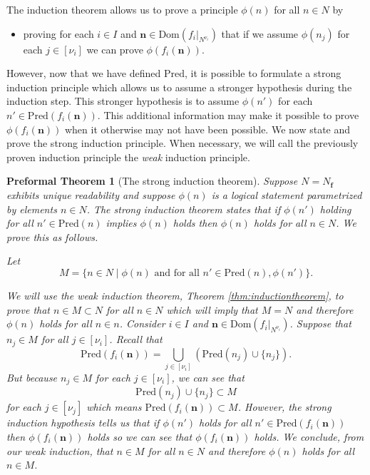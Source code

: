 \documentclass[oneside, 12pt]{book}
\theoremstyle{break}
\newtheorem{preformal definition}[definition]{Preformal Definition}
\newtheorem{preformal theorem}[theorem]{Preformal Theorem}
\newcommand{\bv}[1]{\boldsymbol{#1}}
\begin{document}
			The induction theorem allows us to prove a principle $\phi(n)$ for all $n\in N$ by 
			\begin{itemize}
				\item{proving for each $i\in I$ and $\bv{n}\in\text{Dom}(f_i|_{N^{\nu_i}})$ that if we assume $\phi(n_j)$ for each $j\in [\nu_i]$ we can prove $\phi(f_i(\bv{n}))$.}
			\end{itemize}
			However, now that we have defined $\text{Pred}$, it is possible to formulate a strong induction principle which allows us to assume a stronger hypothesis during the induction step.
			This stronger hypothesis is to assume $\phi(n')$ for each $n'\in \text{Pred}(f_i(\bv{n}))$.
			This additional information may make it possible to prove $\phi(f_i(\bv{n}))$ when it otherwise may not have been possible.
			We now state and prove the strong induction principle.
			When necessary, we will call the previously proven induction principle the \textit{weak} induction principle.
			
			\begin{preformal theorem}[The strong induction theorem]
				Suppose $N = N_{\bv{f}}$ exhibits unique readability and suppose $\phi(n)$ is a logical statement parametrized by elements $n\in N$.
				The strong induction theorem states that if $\phi(n')$ holding for all $n' \in \text{Pred}(n)$ implies $\phi(n)$ holds then $\phi(n)$ holds for all $n\in N$.
				We prove this as follows.
				
				Let 
				\begin{equation*}
					M = \{n \in N \mid \phi(n) \text{ and for all } n' \in \text{Pred}(n), \phi(n')\}.
				\end{equation*}

				We will use the weak induction theorem, Theorem \ref{thm:inductiontheorem}, to prove that $n\in M\subset N$ for all $n\in N$ which will imply that $M=N$ and therefore $\phi(n)$ holds for all $n\in n$.
				Consider $i\in I$ and $\bv{n} \in \text{Dom}(f_i|_{N^{\nu_i}})$.
				Suppose that $n_j \in M$ for all $j \in [\nu_i]$.
				Recall that
				\begin{equation*}
					\text{Pred}(f_i( \bv{n})) = \bigcup_{j\in [\nu_i]} \left(\text{Pred}(n_j) \cup \{n_j\}\right).
				\end{equation*}	
				But because $n_j \in M$ for each $j \in [\nu_i]$, we can see that 
				\begin{equation*}
					\text{Pred}(n_j) \cup \{n_j\} \subset M
				\end{equation*}
				for each $j\in [\nu_j]$ which means $\text{Pred}(f_i(\bv{n})) \subset M$.
				However, the strong induction hypothesis tells us that if $\phi(n')$ holds for all $n' \in \text{Pred}(f_i(\bv{n}))$ then $\phi(f_i(\bv{n}))$ holds so we can see that $\phi(f_i(\bv{n}))$ holds.
				We conclude, from our weak induction, that $n\in M$ for all $n\in N$ and therefore $\phi(n)$ holds for all $n\in M$.
			\end{preformal theorem}
			
\end{document}
